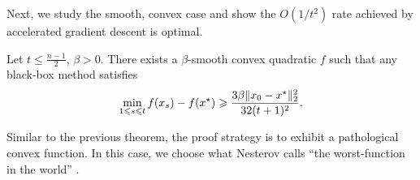 Next, we study the smooth, convex case and show the $O(1/t^2)$ rate achieved by
accelerated gradient descent is optimal.

\begin{theorem}[Smooth-$f$]\label{theorem:lb-smooth}
Let $t \leq \frac{n-1}{2}$, $\beta > 0$. There exists a $\beta$-smooth convex
quadratic $f$ such that any black-box method satisfies
\begin{align}
    \min_{1 \leqslant s \leqslant t} f(x_s) - f(x^\star)
    \geqslant \frac{3\beta \lVert x_0 - x^\star\rVert_2^2}{32(t+1)^2}.
\end{align}
\end{theorem}
Similar to the previous theorem, the proof strategy is to exhibit 
a pathological convex function. In this case, we choose what Nesterov calls
``the worst-function in the world'' \cite{nesterov04}.

